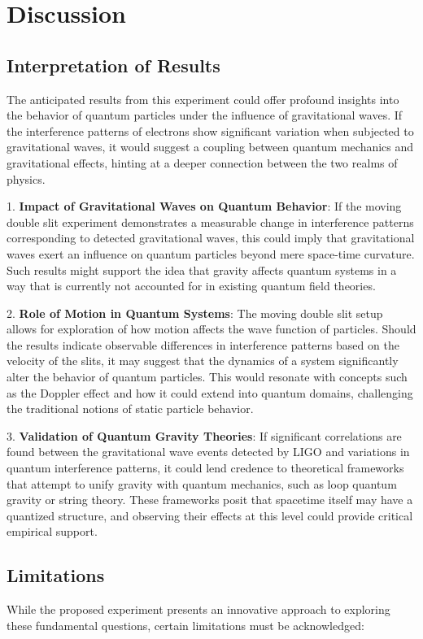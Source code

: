 \documentclass{article}
\begin{document}
\section{Discussion}

\subsection{Interpretation of Results}
The anticipated results from this experiment could offer profound insights into the behavior of quantum particles under the influence of gravitational waves. If the interference patterns of electrons show significant variation when subjected to gravitational waves, it would suggest a coupling between quantum mechanics and gravitational effects, hinting at a deeper connection between the two realms of physics.

1. \textbf{Impact of Gravitational Waves on Quantum Behavior}: If the moving double slit experiment demonstrates a measurable change in interference patterns corresponding to detected gravitational waves, this could imply that gravitational waves exert an influence on quantum particles beyond mere space-time curvature. Such results might support the idea that gravity affects quantum systems in a way that is currently not accounted for in existing quantum field theories.

2. \textbf{Role of Motion in Quantum Systems}: The moving double slit setup allows for exploration of how motion affects the wave function of particles. Should the results indicate observable differences in interference patterns based on the velocity of the slits, it may suggest that the dynamics of a system significantly alter the behavior of quantum particles. This would resonate with concepts such as the Doppler effect and how it could extend into quantum domains, challenging the traditional notions of static particle behavior.

3. \textbf{Validation of Quantum Gravity Theories}: If significant correlations are found between the gravitational wave events detected by LIGO and variations in quantum interference patterns, it could lend credence to theoretical frameworks that attempt to unify gravity with quantum mechanics, such as loop quantum gravity or string theory. These frameworks posit that spacetime itself may have a quantized structure, and observing their effects at this level could provide critical empirical support.

\subsection{Limitations}
While the proposed experiment presents an innovative approach to exploring these fundamental questions, certain limitations must be acknowledged:
\end{document}
